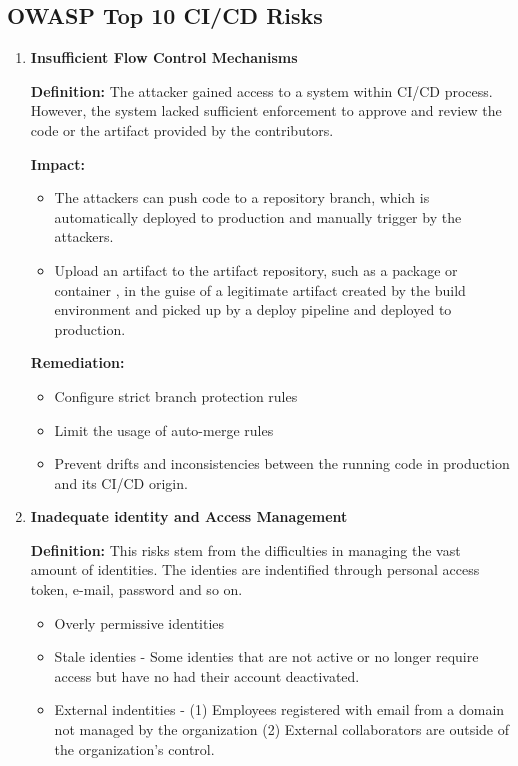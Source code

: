 \subsection{OWASP Top 10 CI/CD Risks\cite{OWASP2023}}
\begin{enumerate}[label=(\arabic*)]
    \item \textbf{Insufficient Flow Control Mechanisms}
    
    \textbf{Definition: }The attacker gained access to a system within CI/CD process.
    However, the system lacked sufficient enforcement to approve and review the code or the artifact
    provided by the contributors.

    \textbf{Impact: }
        \begin{itemize}
            \item The attackers can push code to a repository branch, which is automatically
            deployed to production and manually trigger by the attackers.
            \item Upload an artifact to the artifact repository, such as a package or container
            , in the guise of a legitimate artifact created by the build environment and picked 
            up by a deploy pipeline and deployed to production.
        \end{itemize}
    
    \textbf{Remediation:}
    \begin{itemize}
        \item Configure strict branch protection rules
        \item Limit the usage of auto-merge rules
        \item Prevent drifts and inconsistencies between the running code in production and its 
        CI/CD origin.
    \end{itemize}
    \item \textbf{Inadequate identity and Access Management}
    
    \textbf{Definition: }This risks stem from the difficulties in managing the vast amount of
    identities. The identies are indentified through personal access token, e-mail, password and so on.
        \begin{itemize}
            \item Overly permissive identities
            \item Stale identies - Some identies that are not active or no longer require access but have
            no had their account deactivated.
            \item External indentities - (1) Employees registered with email from a domain not managed by 
            the organization (2) External collaborators are outside of the organization's control.
        \end{itemize}


\end{enumerate}
